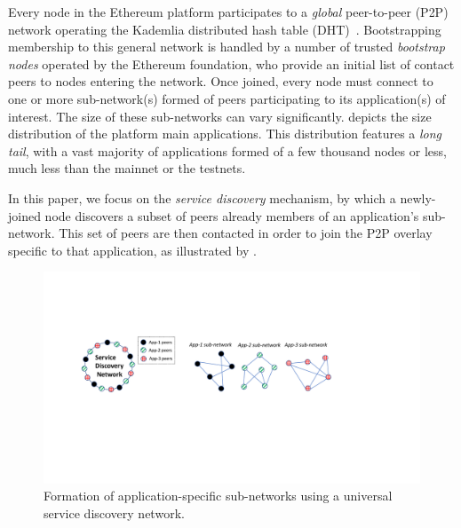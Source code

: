 Every node in the Ethereum platform participates to a \emph{global} peer-to-peer (P2P) network operating the Kademlia distributed hash table (DHT)~\cite{maymounkov2002kademlia}. 
Bootstrapping membership to this general network is handled by a number of trusted \emph{bootstrap nodes} operated by the Ethereum foundation, who provide an initial list of contact peers to nodes entering the network.
Once joined, every node must connect to one or more sub-network(s) formed of peers participating to its application(s) of interest.
The size of these sub-networks can vary significantly.
 depicts the size distribution of the platform main applications.
This distribution features a \emph{long tail}, with a vast majority of applications formed of a few thousand nodes or less, much less than the mainnet or the testnets. 

In this paper, we focus on the \emph{service discovery} mechanism, by which a newly-joined node discovers a subset of peers already members of an application's sub-network.
This set of peers are then contacted in order to join the P2P overlay specific to that application, as illustrated by .

\begin{figure}[b!]
    \includegraphics[width=1\linewidth]{img/subnetwork}
    \caption{Formation of application-specific sub-networks using a universal service discovery network.
    \protect{}
    }
    \label{fig:subnetwork}
\end{figure}

